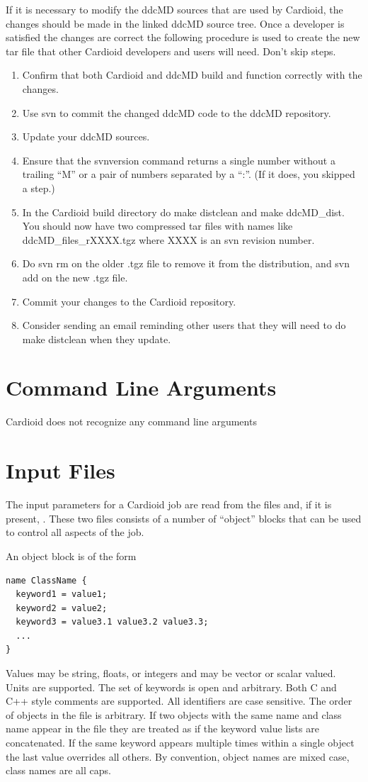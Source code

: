 \documentclass{article}
\begin{document}
If it is necessary to modify the ddcMD sources that are used by
Cardioid, the changes should be made in the linked ddcMD source tree.
Once a developer is satisfied the changes are correct the following
procedure is used to create the new tar file that other Cardioid
developers and users will need.  Don't skip steps.
\begin{enumerate}
\item Confirm that both Cardioid and ddcMD build and function correctly
  with the changes.
\item Use svn to commit the changed ddcMD code to the ddcMD repository.
\item Update your ddcMD sources.  
\item Ensure that the svnversion command returns a single number without
  a trailing ``M'' or a pair of numbers separated by a ``:''.  (If it
  does, you skipped a step.)
\item In the Cardioid build directory do make distclean and make
  ddcMD\_dist.  You should now have two compressed tar files with names
  like ddcMD\_files\_rXXXX.tgz where XXXX is an svn revision number.
\item Do svn rm on the older .tgz file to remove it from the
  distribution, and svn add on the new .tgz file.  
\item Commit your changes to the Cardioid repository.
\item Consider sending an email reminding other users that they will
  need to do make distclean when they update.
\end{enumerate}

\section{Command Line Arguments}

Cardioid does not recognize any command line arguments

\section{Input Files}

The input parameters for a Cardioid job are read from the files
 and, if it is present, .  These two
files consists of a number of ``object'' blocks that can be used to
control all aspects of the job.

An object block is of the form
\begin{verbatim}
name ClassName { 
  keyword1 = value1; 
  keyword2 = value2;
  keyword3 = value3.1 value3.2 value3.3;
  ...
}
\end{verbatim}
Values may be string, floats, or integers and may be vector or scalar
valued.  Units are supported.  The set of keywords is open and
arbitrary.  Both C and C++ style comments are supported.  All
identifiers are case sensitive.  The order of objects in the file is
arbitrary.  If two objects with the same name and class name appear in
the file they are treated as if the keyword value lists are
concatenated.  If the same keyword appears multiple times within a
single object the last value overrides all others.  By convention,
object names are mixed case, class names are all caps.
\end{document}
